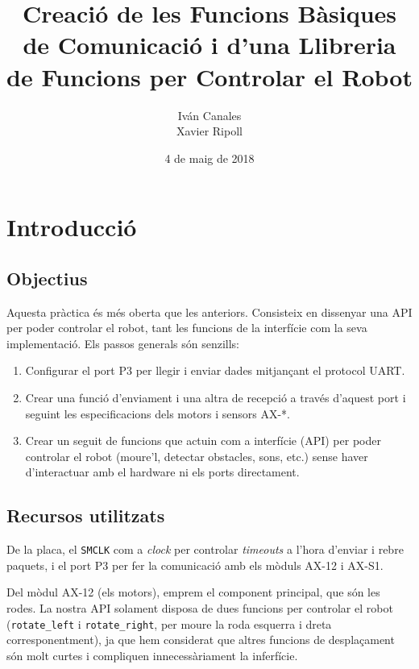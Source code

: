 \documentclass{../pdae} %
\title{Creació de les Funcions Bàsiques de Comunicació i d'una Llibreria de
Funcions per Controlar el Robot}
\author{
    Iván Canales\\
    Xavier Ripoll
}
\date{4 de maig de 2018}
\begin{document}
\maketitle

\section{Introducció}

\subsection{Objectius}

Aquesta pràctica és més oberta que les anteriors. Consisteix en dissenyar una
API per poder controlar el robot, tant les funcions de la interfície com
la seva implementació. Els passos generals són senzills:

\begin{enumerate}
  \item Configurar el port P3 per llegir i enviar dades mitjançant el protocol
        UART.
  \item Crear una funció d'enviament i una altra de recepció a través d'aquest
        port i seguint les especificacions dels motors i sensors AX-*.
  \item Crear un seguit de funcions que actuin com a interfície (API) per poder
        controlar el robot (moure'l, detectar obstacles, sons, etc.) sense
        haver d'interactuar amb el hardware ni els ports directament.
\end{enumerate}



\subsection{Recursos utilitzats}
De la placa, el \texttt{SMCLK} com a \textit{clock} per controlar
\textit{timeouts} a l'hora d'enviar i rebre paquets, i el port P3 per fer la
comunicació amb els mòduls AX-12 i AX-S1.

Del mòdul AX-12 (els motors), emprem el component principal, que són les rodes.
La nostra API solament disposa de dues funcions per controlar el robot
(\texttt{rotate\_left} i \texttt{rotate\_right}, per moure la roda esquerra i
dreta corresponentment), ja que hem considerat que altres funcions de
desplaçament són molt curtes i compliquen innecessàriament la inferfície.
\end{document}
